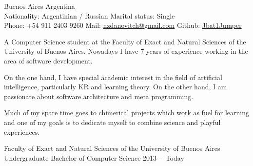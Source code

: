 \documentclass[10pt,a4paper]{article}
\begin{document}
\sloppy



\nobreakvspace{0.3em}

\noindent
Buenos Aires \sbull
Argentina \\
Nationality: Argentinian / Russian \sbull
Marital status: Single \\
Phone: +54 911 2403 9260 \sbull
Mail: \href{mailto:nzdanovitch.at.gmail.dot.com}{nzdanovitch\mbox{}@\mbox{}gmail.com} \sbull
Github: \href{http://github.com/Jbat1Jumper}{Jbat1Jumper}


\spacedhrule{1.2em}{-0.4em}  %





\vspace{-1.3em}
\begin{multicols}{2}
\noindent

A Computer Science student at the Faculty of Exact and Natural Sciences of
the University of Buenos Aires. Nowadays I have 7 years of experience working
in the area of software development.

On the one hand, I have special academic interest in the field of artificial
intelligence, particularly KR and learning theory. On the other hand, I am
passionate about software architecture and meta programming.

Much of my spare time goes to chimerical projects which work as fuel for
learning and one of my goals is to dedicate myself to combine science and
playful experiences.


%
%

\end{multicols}


\spacedhrule{0.3em}{-0.4em} %




\vspace{0.2em}
\headedsection
  { Faculty of Exact and Natural Sciences of the University of Buenos Aires }
  { \textsc{} } {%
  \headedsubsection
    { Undergraduate Bachelor of Computer Science }
    { 2013 --\ Today \ }{}
}
\end{document}
